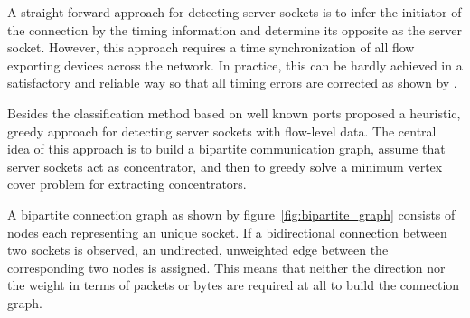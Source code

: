 A straight-forward approach for detecting \glspl{server socket} is to infer the initiator of the connection by the timing information and determine its opposite as the \gls{server socket}. However, this approach requires a time synchronization of all flow exporting devices across the network. In practice, this can be hardly achieved in a satisfactory and reliable way so that all timing errors are corrected as shown by \citet{Trammell}.

Besides the classification method based on well known ports \citet{Schatzmann:Mining,Schatzmann:Dissection,Schatzmann:Tracing} proposed a heuristic, greedy approach for detecting \glspl{server socket} with flow-level data. The central idea of this approach is to build a bipartite communication graph, assume that server sockets act as concentrator, and then to greedy solve a minimum vertex cover problem for extracting concentrators.

A bipartite connection graph as shown by figure \ref{fig:bipartite_graph} consists of nodes each representing an unique socket. If a bidirectional connection between two sockets is observed, an undirected, unweighted edge between the corresponding two nodes is assigned. This means that neither the direction nor the weight in terms of packets or bytes are required at all to build the connection graph.

